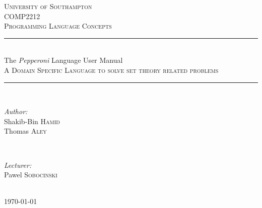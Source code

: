 \documentclass[11pt]{article}
\begin{document}

\begin{titlepage}

\newcommand{\HRule}{\rule{\linewidth}{0.5mm}}

\center 
\textsc{\LARGE University of Southampton}\\[1.5cm] %
\textsc{\Large COMP2212}\\[0.5cm] %
\textsc{\large Programming Language Concepts}\\[0.5cm] %

\HRule \\[0.4cm]
{ \huge The \emph{Pepperoni} Language User Manual}\\[0.4cm] %
\textsc{A Domain Specific Language to solve set theory related problems}
\HRule \\[1.5cm]

\begin{minipage}{0.4\textwidth}
\begin{flushleft} \large
\emph{Author:}\\
Shakib-Bin \textsc{Hamid}\\
Thomas \textsc{Aley}\\
\end{flushleft}
\end{minipage}
~
\begin{minipage}{0.4\textwidth}
\begin{flushright} \large
\emph{Lecturer:} \\
Pawel \textsc{Sobocinski} 
\end{flushright}
\end{minipage}\\[4cm]

{\large \today}\\[3cm]

\vfill

\end{titlepage}
\tableofcontents
\newpage


\newcommand*\block{\item[\ding{111}]}
\newcommand{\ighlightedItem}[1]{\block \textbf{\textit{#1}}}
\end{document}

